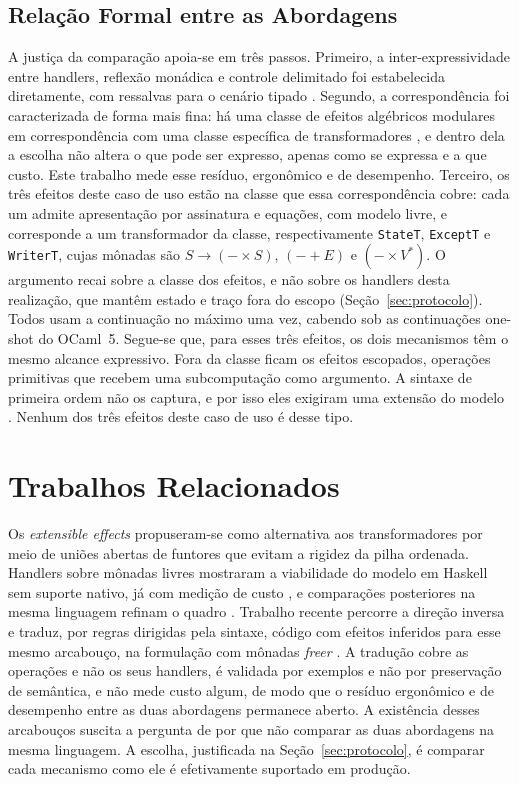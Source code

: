\documentclass[12pt]{article}
\begin{document}
\subsection{Relação Formal entre as Abordagens}\label{sec:relacao}

A justiça da comparação apoia-se em três passos. Primeiro, a
inter-expressividade entre handlers, reflexão monádica e controle
delimitado foi estabelecida diretamente, com ressalvas para o cenário tipado
\cite{forster:17}. Segundo, a correspondência foi caracterizada de forma mais
fina: há uma classe de efeitos algébricos modulares em
correspondência com uma classe específica de transformadores
\cite{schrijvers:19}, e dentro dela a escolha não altera o que pode ser
expresso, apenas como se expressa e a que custo. Este trabalho mede esse
resíduo, ergonômico e de desempenho. Terceiro, os três efeitos deste caso de
uso estão na classe que essa correspondência cobre: cada um admite
apresentação por assinatura e equações, com modelo livre, e corresponde a um
transformador da classe, respectivamente \texttt{StateT}, \texttt{ExceptT} e
\texttt{WriterT}, cujas mônadas são $S\to(-\times S)$, $(-+E)$ e
$(-\times V^*)$. O argumento recai sobre a classe dos efeitos, e não sobre os
handlers desta realização, que mantêm estado e traço fora do escopo
(Seção~\ref{sec:protocolo}). Todos usam a continuação no máximo uma vez, cabendo
sob as continuações one-shot do OCaml~5. Segue-se que, para esses
três efeitos, os dois mecanismos têm o mesmo alcance expressivo. Fora da
classe ficam os efeitos escopados, operações primitivas que recebem uma
subcomputação como argumento. A sintaxe de primeira ordem não os captura, e
por isso eles exigiram uma extensão do modelo \cite{wu:14}. Nenhum dos três
efeitos deste caso de uso é desse tipo.

\section{Trabalhos Relacionados}\label{sec:relacionados}

Os \textit{extensible effects} \cite{kiselyov:13} propuseram-se como
alternativa aos transformadores por meio de uniões abertas de funtores que
evitam a rigidez da pilha ordenada. Handlers sobre mônadas livres
mostraram a viabilidade do modelo em Haskell sem suporte nativo, já com
medição de custo \cite{kammar:13}, e comparações posteriores na mesma
linguagem refinam o quadro \cite{xie:20}. Trabalho recente \cite{joriatti:25}
percorre a direção inversa e traduz, por regras dirigidas pela sintaxe, código
com efeitos inferidos para esse mesmo arcabouço, na formulação com mônadas
\textit{freer} \cite{kiselyov:15}. A
tradução cobre as operações e não os seus handlers, é validada por
exemplos e não por preservação de semântica, e não mede custo algum, de modo
que o resíduo ergonômico e de desempenho entre as duas abordagens permanece
aberto. A existência desses arcabouços suscita a
pergunta de por que não comparar as duas abordagens na mesma linguagem. A
escolha, justificada na Seção~\ref{sec:protocolo}, é comparar cada mecanismo
como ele é efetivamente suportado em produção.
\end{document}
